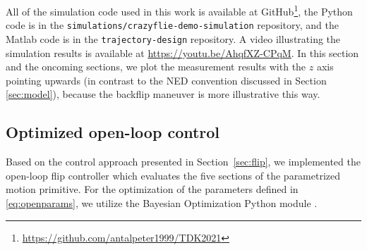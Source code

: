 All of the simulation code used in this work is available at GitHub\footnote{\url{https://github.com/antalpeter1999/TDK2021}}, the Python code is in the \verb+simulations/crazyflie-demo-simulation+ repository, and the Matlab code is in the \verb+trajectory-design+ repository. A video illustrating the simulation results is available at \url{https://youtu.be/AhqfXZ-CPqM}. In this section and the oncoming sections, we plot the measurement results with the $z$ axis pointing upwards (in contrast to the NED convention discussed in Section \ref{sec:model}), because the backflip maneuver is more illustrative this way.

\subsection{Optimized open-loop control}\label{sec:opensimu}
Based on the control approach presented in Section~\ref{sec:flip}, we implemented the open-loop flip controller which evaluates the five sections of the parametrized motion primitive. For the optimization of the parameters defined in \eqref{eq:openparams}, we utilize the Bayesian Optimization Python module \cite{bayesopt}.%


